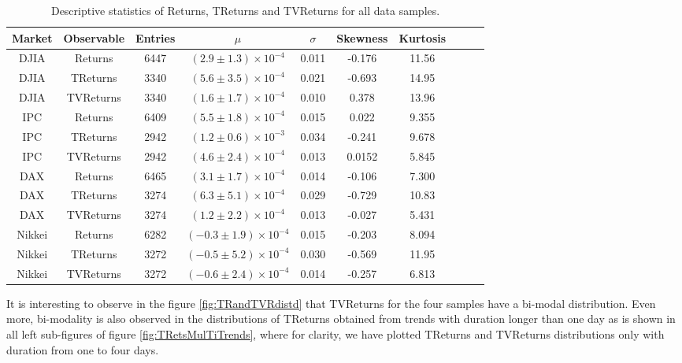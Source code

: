 \documentclass{elsarticle}
\begin{document}
\begin{table}[htb]
	\begin{center}
		\setlength\tabcolsep{3.2pt} %
		{\renewcommand{\arraystretch}{1.1}%
		\begin{tabular}{|c|c|c|c|c|c|c|c|c|c|}
			\hline
			Market&Observable&Entries&$\mu$&$\sigma$&Skewness&Kurtosis\\
			\hline
			\hline
			DJIA&Returns& 6447& $(2.9 \pm 1.3) \!\times\!10^{-4}$&0.011&-0.176&11.56\\
			\hline
			DJIA&TReturns& 3340& $(5.6 \pm 3.5) \!\times\!10^{-4}$&0.021&-0.693&14.95\\
			\hline
			DJIA&TVReturns& 3340& $(1.6 \pm 1.7) \!\times\!10^{-4}$&0.010&0.378&13.96\\
			\hline
      IPC&Returns&6409& $(5.5 \pm 1.8) \!\times\!10^{-4}$&0.015&0.022&9.355\\
			\hline
			IPC&TReturns&2942& $(1.2 \pm 0.6) \!\times\!10^{-3}$&0.034&-0.241&9.678\\
			\hline
			IPC&TVReturns&2942& $(4.6 \pm 2.4) \!\times\!10^{-4}$&0.013&0.0152&5.845\\
			\hline
			DAX&Returns&6465& $(3.1 \pm 1.7) \!\times\!10^{-4}$&0.014&-0.106&7.300\\
			\hline
			DAX&TReturns&3274& $(6.3 \pm 5.1) \!\times\!10^{-4}$&0.029&-0.729&10.83\\
			\hline
			DAX&TVReturns&3274& $(1.2 \pm 2.2) \!\times\!10^{-4}$&0.013&-0.027&5.431\\
			\hline
			Nikkei&Returns&6282& $(-0.3 \pm 1.9) \!\times\!10^{-4}$&0.015&-0.203&8.094\\
			\hline
			Nikkei&TReturns&3272& $(-0.5 \pm 5.2) \!\times\!10^{-4}$&0.030&-0.569&11.95\\
			\hline
			Nikkei&TVReturns&3272& $(-0.6 \pm 2.4) \!\times\!10^{-4}$&0.014&-0.257&6.813\\
			\hline
			\hline
		\end{tabular}
		}
	\caption[]{\small Descriptive statistics of Returns, TReturns and TVReturns for all data samples.}
	\label{Tab:TabStats}
	\end{center}
\end{table}

It is interesting to observe in the figure \ref{fig:TRandTVRdistd} that TVReturns for the four samples have a bi-modal distribution. Even more, bi-modality is also observed in the distributions of TReturns obtained from trends with duration longer than one day as is shown in all left sub-figures of figure \ref{fig:TRetsMulTiTrends}, where for clarity, we have plotted TReturns and TVReturns distributions only with duration from one to four days.
\end{document}
